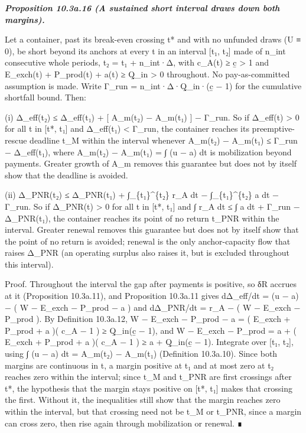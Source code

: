 \documentclass[
]{article}
\begin{document}
\emph{\textbf{Proposition 10.3a.16 (A sustained short interval draws
down both margins).}}

Let a container, past its break-even crossing t* and with no unfunded
draws (U ≡ 0), be short beyond its anchors at every t in an interval
{[}t₁, t₂{]} made of n\_int consecutive whole periods, t₂ = t₁ +
n\_int·Δ, with c\_A(t) ≥ c̲ \textgreater{} 1 and E\_exch(t) + P\_prod(t)
+ a(t) ≥ Q̲\_in \textgreater{} 0 throughout. No pay-as-committed
assumption is made. Write Γ\_run = n\_int·Δ·Q̲\_in·(c̲ − 1) for the
cumulative shortfall bound. Then:

(i) Δ\_eff(t₂) ≤ Δ\_eff(t₁) + {[} A\_m(t₂) − A\_m(t₁) {]} − Γ\_run. So
if Δ\_eff(t) \textgreater{} 0 for all t in {[}t*, t₁{]} and Δ\_eff(t₁)
\textless{} Γ\_run, the container reaches its preemptive-rescue deadline
t\_M within the interval whenever A\_m(t₂) − A\_m(t₁) ≤ Γ\_run −
Δ\_eff(t₁), where A\_m(t₂) − A\_m(t₁) = ∫ (u − a) dt is mobilization
beyond payments. Greater growth of A\_m removes this guarantee but does
not by itself show that the deadline is avoided.

(ii) Δ\_PNR(t₂) ≤ Δ\_PNR(t₁) + ∫\_\{t₁\}\^{}\{t₂\} r\_A dt −
∫\_\{t₁\}\^{}\{t₂\} a dt − Γ\_run. So if Δ\_PNR(t) \textgreater{} 0 for
all t in {[}t*, t₁{]} and ∫ r\_A dt ≤ ∫ a dt + Γ\_run − Δ\_PNR(t₁), the
container reaches its point of no return t\_PNR within the interval.
Greater renewal removes this guarantee but does not by itself show that
the point of no return is avoided; renewal is the only anchor-capacity
flow that raises Δ\_PNR (an operating surplus also raises it, but is
excluded throughout this interval).

Proof. Throughout the interval the gap after payments is positive, so δR
accrues at it (Proposition 10.3a.11), and Proposition 10.3a.11 gives
dΔ\_eff/dt = (u − a) − ( W − E\_exch − P\_prod − a ) and dΔ\_PNR/dt =
r\_A − ( W − E\_exch − P\_prod ). By Definition 10.3a.12, W − E\_exch −
P\_prod − a = ( E\_exch + P\_prod + a )( c\_A − 1 ) ≥ Q̲\_in(c̲ − 1), and
W − E\_exch − P\_prod = a + ( E\_exch + P\_prod + a )( c\_A − 1 ) ≥ a +
Q̲\_in(c̲ − 1). Integrate over {[}t₁, t₂{]}, using ∫ (u − a) dt = A\_m(t₂)
− A\_m(t₁) (Definition 10.3a.10). Since both margins are continuous in
t, a margin positive at t₁ and at most zero at t₂ reaches zero within
the interval; since t\_M and t\_PNR are first crossings after t*, the
hypothesis that the margin stays positive on {[}t*, t₁{]} makes that
crossing the first. Without it, the inequalities still show that the
margin reaches zero within the interval, but that crossing need not be
t\_M or t\_PNR, since a margin can cross zero, then rise again through
mobilization or renewal. ∎
\end{document}
